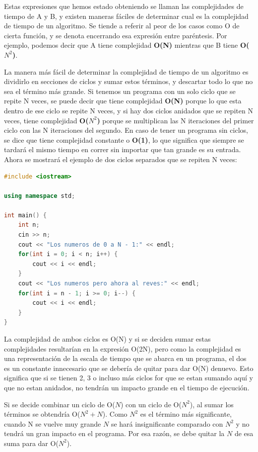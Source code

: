\documentclass{article}
\begin{document}
Estas expresiones que hemos estado obteniendo se llaman las complejidades de tiempo de A y B, y existen maneras fáciles de determinar cual es la complejidad de tiempo de un algoritmo. Se tiende a referir al peor de los casos como O de cierta función, y se denota encerrando esa expresión entre paréntesis. Por ejemplo, podemos decir que A tiene complejidad \textbf{O(N)} mientras que B tiene \textbf{O($N^2$)}.

La manera más fácil de determinar la complejidad de tiempo de un algoritmo es dividirlo en secciones de ciclos y sumar estos términos, y descartar todo lo que no sea el término más grande. Si tenemos un programa con un solo ciclo que se repite N veces, se puede decir que tiene complejidad \textbf{O(N)} porque lo que esta dentro de ese ciclo se repite N veces, y si hay dos ciclos anidados que se repiten N veces, tiene complejidad \textbf{O($N^2$)} porque se multiplican las N iteraciones del primer ciclo con las N iteraciones del segundo. En caso de tener un programa sin ciclos, se dice que tiene complejidad constante o \textbf{O(1)}, lo que significa que siempre se tardará el mismo tiempo en correr sin importar que tan grande es su entrada. Ahora se mostrará el ejemplo de dos ciclos separados que se repiten N veces:

\begin{lstlisting}[language=C++, title=Encontrando primos menores que N]
#include <iostream>

using namespace std;

int main() {
	int n;
	cin >> n;
	cout << "Los numeros de 0 a N - 1:" << endl;
	for(int i = 0; i < n; i++) {
		cout << i << endl;
	}
	cout << "Los numeros pero ahora al reves:" << endl;
	for(int i = n - 1; i >= 0; i--) {
		cout << i << endl;
	}
}
\end{lstlisting}

La complejidad de ambos ciclos es O(N) y si se deciden sumar estas complejidades resultarían en la expresión O(2N), pero como la complejidad es una representación de la escala de tiempo que se abarca en un programa, el dos es un constante innecesario que se debería de quitar para dar O(N) denuevo. Esto significa que si se tienen 2, 3 o incluso más ciclos for que se estan sumando aquí y que no estan anidados, no tendrán un impacto grande en el tiempo de ejecución.

Si se decide combinar un ciclo de O($N$) con un ciclo de O($N^2$), al sumar los términos se obtendría O($N^2 + N$). Como $N^2$ es el término más significante, cuando N se vuelve muy grande $N$ se hará insignificante comparado con $N^2$ y no tendrá un gran impacto en el programa. Por esa razón, se debe quitar la $N$ de esa suma para dar O($N^2$).
\end{document}
